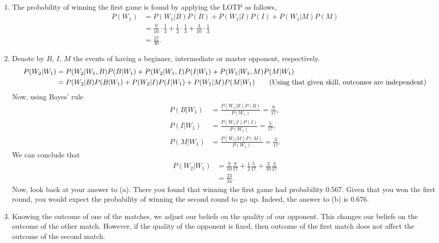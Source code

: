 

\setcounter{theorem}{34}
\begin{exercise}[BH.2.35]
\begin{solution}~
	\begin{enumerate}
		\item The probability of winning the first game is found by applying the LOTP as follows,
		\begin{align*}
			P(W_{1}) &= P(W_{1}|B)P(B) + P(W_{1}|I)P(I) + P(W_{1}|M)P(M)\\
			& = \frac{9}{10}\cdot\frac{1}{3} + \frac{1}{2}\cdot\frac{1}{3} + \frac{3}{10}\cdot\frac{1}{3}\\
			& = \frac{17}{30}.
		\end{align*}
		\item Denote by $B$, $I$, $M$ the events of having a beginner, intermediate or master opponent, respectively.
		\begin{align*}
			P(W_{2}|W_{1}) &= P(W_{2}|W_{1},B)P(B|W_{1}) + P(W_{2}|W_{1},I)P(I|W_{1}) + P(W_{1}|W_{1},M)P(M|W_{1})\\
			&= P(W_{2}|B)P(B|W_{1}) + P(W_{2}|I)P(I|W_{1}) + P(W_{1}|M)P(M|W_{1})\tag*{(\text{Using that given skill, outcomes are independent})}
		\end{align*}
		Now, using Bayes' rule
		\begin{align*}
			P(B|W_{1})&=\frac{P(W_{1}|B)P(B)}{P(W_{1})}=\frac{9}{17},\\
			P(I|W_{1})&=\frac{P(W_{1}|I)P(I)}{P(W_{1})}=\frac{5}{17},\\
			P(M|W_{1})&=\frac{P(W_{1}|M)P(M)}{P(W_{1})}=\frac{3}{17}.
		\end{align*}
		We can conclude that
		\begin{align*}
			P(W_{2}|W_{1}) &= \frac{9}{10}\frac{9}{17} + \frac{1}{2}\frac{5}{17}+\frac{3}{10}\frac{3}{17}\\
			& = \frac{23}{34}.
		\end{align*}
		Now, look back at your answer to (a). There you found that winning the first game had probability 0.567. Given that you won the first round, you would expect the probability of winning the second round to go up. Indeed, the answer to (b) is 0.676.
		\item Knowing the outcome of one of the matches, we adjust our beliefs on the quality of our opponent. This changes our beliefs on the outcome of the other match. However, if the quality of the opponent is fixed, then outcome of the first match does not affect the outcome of the second match.  
	\end{enumerate}
\end{solution}
\end{exercise}

